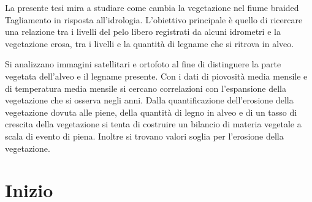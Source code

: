 \documentclass[12pt,a4paper,italian,twoside]{scrbook}
\begin{document}
%

\frontmatter
La presente tesi mira a studiare come cambia la vegetazione nel fiume braided Tagliamento in risposta all'idrologia. 
L'obiettivo principale è quello di ricercare una relazione tra i livelli del pelo libero registrati da alcuni idrometri e la vegetazione erosa, tra i livelli e la quantità di legname che si ritrova in alveo.

Si analizzano immagini satellitari e ortofoto al fine di distinguere la parte vegetata dell'alveo e il legname presente.
Con i dati di piovosità media mensile e di temperatura media mensile si cercano correlazioni con l'espansione della vegetazione che si osserva negli anni.
Dalla quantificazione dell'erosione della vegetazione dovuta alle piene, della quantità di legno in alveo e di un tasso di crescita della vegetazione si tenta di costruire un bilancio di materia vegetale a scala di evento di piena.
Inoltre si trovano valori soglia per l'erosione della vegetazione.


\tableofcontents
\listoffigures
\listoftables



\mainmatter
\chapter{Inizio}
\end{document}
